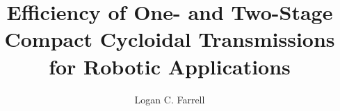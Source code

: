 \documentclass[draft, onecolumn, letterpaper, 12pt]{ruthesis}
\title{Efficiency of One- and Two-Stage Compact Cycloidal Transmissions for Robotic Applications}
\author{Logan C. Farrell}
\begin{document}
  \begin{frontmatter}
   \maketitle
   
   \tableofcontents
   \listoffigures
   \listoftables
  \end{frontmatter}


%
%






%
%
%
%
%
%
%
%

\appendix




\end{document}
